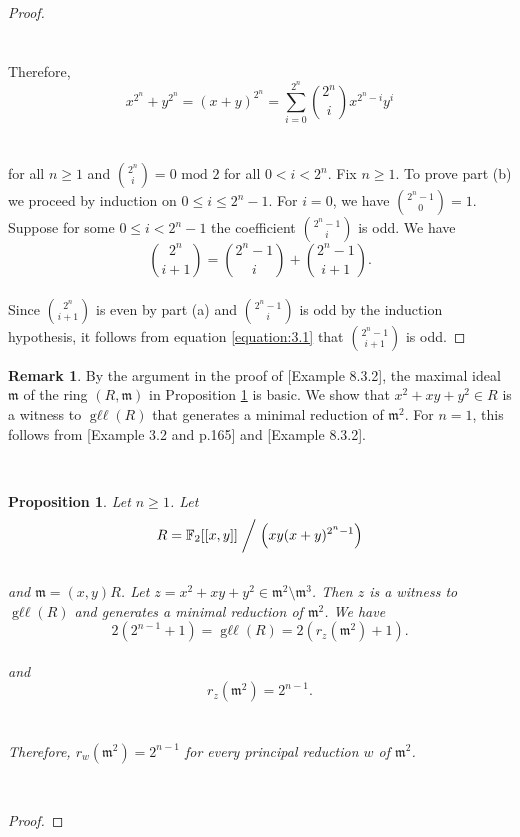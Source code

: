 \documentclass{amsart}
\newtheorem{proposition}[theorem]{Proposition}
\theoremstyle{definition}
\theoremstyle{definition}
\newtheorem{remark}[theorem]{Remark}
\numberwithin{equation}{section}
\theoremstyle{definition}
\DeclareMathOperator{\Gll}{g\ell\ell}
\begin{document}
{\begin{proof}
\[\] \text{}\\\\ Therefore,
\[
x^{2^n} + y^{2^n}=(x+y)^{2^n}=\sum\limits_{i=0}^{2^n} \binom{2^n}{i}x^{2^n-i}y^i
\] \text{}\\\\ for all $n \geq 1$ and $\binom{2^n}{i}=0 \,\, \text{mod} \,\, 2$ for all $0<i<2^n$. Fix $n \geq 1$. To prove part (b) we proceed by induction on $0 \leq i \leq 2^n-1$. For $i=0$, we have $\binom{2^n-1}{0}=1$. Suppose for some $0 \leq i <2^n-1$ the coefficient $\binom{2^n-1}{i}$ is odd. We have \\
\begin{equation}\label{equation:3.1}
\binom{2^n}{i+1} = \binom{2^n-1}{i} + \binom{2^n-1}{i+1}.
\end{equation} \text{}\\ Since $\binom{2^n}{i+1}$ is even by part (a) and $\binom{2^n-1}{i}$ is odd by the induction hypothesis, it follows from equation \ref{equation:3.1} that $\binom{2^n-1}{i+1}$ is odd.
\end{proof}
\text{}
\begin{remark}
By the argument in the proof of \cite{HS06}[Example 8.3.2], the maximal ideal $\mathfrak{m}$ of the ring $(R,\mathfrak{m})$ in Proposition \ref{prop:3.3} is basic. We show that $x^2+xy+y^2 \in R$ is a witness to $\Gll(R)$ that generates a minimal reduction of $\mathfrak{m}^2$. For $n=1$, this follows from \cite{HS97}[Example 3.2 and p.165] and \cite{HS06}[Example 8.3.2].
\end{remark}
\text{}\\
\begin{proposition}\label{prop:3.3}
Let $n \geq 1$. Let \\
\[
R=\mathbb{F}_2[[x,y]] \biggm/ \left( xy(x+y)^{2^n -1}\right)
\] \text{}\\ and $\mathfrak{m}=(x,y)R$. Let $z=x^2+xy+y^2 \in \mathfrak{m}^2 \setminus \mathfrak{m}^3$. Then $z$ is a witness to $\Gll(R)$ and generates a minimal reduction of $\mathfrak{m}^2$. We have\\
\[
2 \left(2^{n-1} +1 \right)=\Gll(R)=2 \left(r_{z}(\mathfrak{m}^2) + 1 \right).
\] \text{}\\ and 
\[
r_{z}(\mathfrak{m}^2)=2^{n-1}.
\] \text{}\\\\
Therefore, $r_{w}(\mathfrak{m}^2)=2^{n-1}$ for every principal reduction $w$ of $\mathfrak{m}^2$.
\end{proposition} 
\text{}\\
\begin{proof}

\end{proof}}
\end{document}

